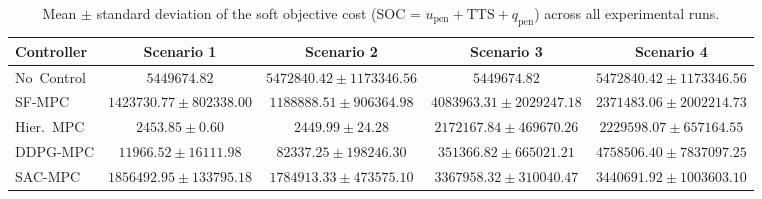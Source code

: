 \begin{table}[htbp]
\centering
\caption{Mean $\pm$ standard deviation of the soft objective cost (SOC = $u_{\mathrm{pen}} + \mathrm{TTS} + q_{\mathrm{pen}}$) across all experimental runs.}
\label{tab:obj_comparison}
\begin{tabular}{lcccc}
\toprule
Controller & Scenario 1 & Scenario 2 & Scenario 3 & Scenario 4 \\
\midrule
No~Control & $5449674.82$ & $5472840.42 \pm 1173346.56$ & $5449674.82$ & $5472840.42 \pm 1173346.56$ \\
SF-MPC & $1423730.77 \pm 802338.00$ & $1188888.51 \pm 906364.98$ & $4083963.31 \pm 2029247.18$ & $2371483.06 \pm 2002214.73$ \\
Hier.~MPC & $2453.85 \pm 0.60$ & $2449.99 \pm 24.28$ & $2172167.84 \pm 469670.26$ & $2229598.07 \pm 657164.55$ \\
DDPG-MPC & $11966.52 \pm 16111.98$ & $82337.25 \pm 198246.30$ & $351366.82 \pm 665021.21$ & $4758506.40 \pm 7837097.25$ \\
SAC-MPC & $1856492.95 \pm 133795.18$ & $1784913.33 \pm 473575.10$ & $3367958.32 \pm 310040.47$ & $3440691.92 \pm 1003603.10$ \\
\bottomrule
\end{tabular}
\end{table}
